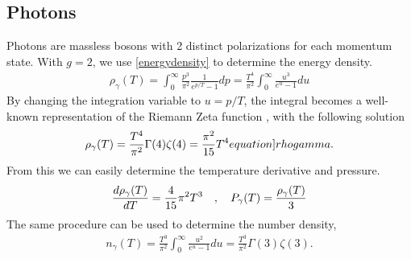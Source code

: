 \subsection{Photons}
Photons are massless bosons with 2 distinct polarizations for each momentum state. With $g=2$, we use \eqref{energydensity} to determine the energy density. 
\begin{align}
    \rho_\gamma(T)=\int_{0}^{\infty} \frac{p^3}{\pi^2}\frac{1}{e^{p/T}-1}dp =  \frac{T^4}{\pi^2}\int_{0}^{\infty}\frac{u^3}{e^{u}-1}du
\end{align}
By changing the integration variable to $u=p/T$, the integral becomes a well-known representation of the Riemann Zeta function \cite[\href{https://dlmf.nist.gov/25.5.E1}{(25.5.1)}]{NIST:DLMF}, with the following solution
\begin{align}
    \rho_\gamma(T)=\frac{T^4}{\pi^2}\Gamma(4)\zeta(4)=\frac{\pi^2}{15}T^4
    \label[equation]{rhogamma}.
\end{align}
From this we can easily determine the temperature derivative and pressure.
\begin{align}
    \frac{d\rho_\gamma(T)}{dT}=\frac{4}{15}\pi^2T^3 \quad , \quad P_\gamma(T)=\frac{\rho_\gamma(T)}{3}
\end{align}
The same procedure can be used to determine the number density,
\begin{align}
    n_\gamma(T)=\frac{T^3}{\pi^2}\int_{0}^{\infty}\frac{u^2}{e^{u}-1}du=\frac{T^3}{\pi^2}\Gamma(3)\zeta(3)
    \label{eq:ngamma}.
\end{align}



